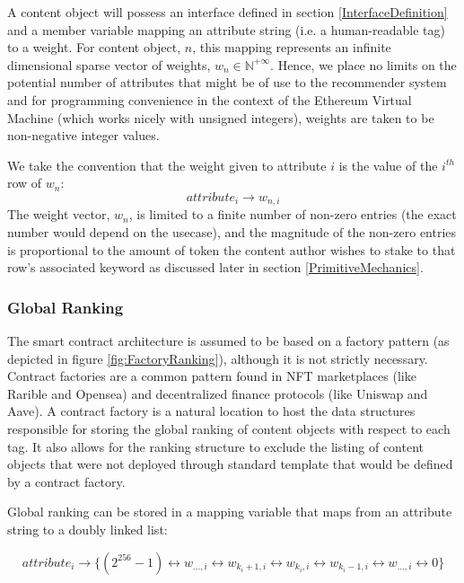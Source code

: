 A content object will possess an interface defined in section \ref{InterfaceDefinition} and a member variable mapping an attribute string (i.e. a human-readable tag) to a weight. For content object, $n$, this mapping represents an infinite dimensional sparse vector of weights, $w_n \in \mathbb{N}^{+\infty}$. Hence, we place no limits on the potential number of attributes that might be of use to the recommender system and for programming convenience in the context of the Ethereum Virtual Machine \cite{wood2014ethereum} (which works nicely with unsigned integers), weights are taken to be non-negative integer values. 

We take the convention that the weight given to  attribute $i$ is the value of the $i^{th}$ row of $w_n$: 
\begin{equation}
    \label{eq:weightVector}
    attribute_i \rightarrow w_{n,i}
\end{equation}
 The weight vector, $w_n$, is limited to a finite number of non-zero entries (the exact number would depend on the usecase), and the magnitude of the non-zero entries is proportional to the amount of token the content author wishes to stake to that row’s associated keyword as discussed later in section \ref{PrimitiveMechanics}. 

\subsubsection{Global Ranking}
\label{GlobalRankingDefinition}


The smart contract architecture is assumed to be based on a factory pattern (as depicted in figure \ref{fig:FactoryRanking}), although it is not strictly necessary. Contract factories are a common pattern found in NFT marketplaces (like Rarible and Opensea) and decentralized finance protocols (like Uniswap and Aave). A contract factory is a natural location to host the data structures responsible for storing the global ranking of content objects with respect to each tag. It also allows for the ranking structure to exclude the listing of content objects that were not deployed through standard template that would be defined by a contract factory. 

Global ranking can be stored in a mapping variable that maps from an attribute string to a doubly linked list:

\begin{equation}
    attribute_i \rightarrow \{(2^{256}-1) \leftrightarrow w_{...,i} \leftrightarrow w_{k_i+1,i} \leftrightarrow w_{k_i,i} \leftrightarrow w_{k_i-1,i} \leftrightarrow w_{...,i} \leftrightarrow 0\}
\end{equation}

